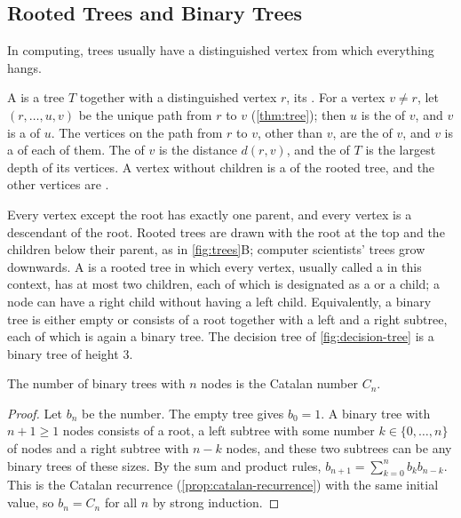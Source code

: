 \subsection{Rooted Trees and Binary Trees}

In computing, trees usually have a distinguished vertex from which everything hangs.

\begin{definition}
\label{def:rooted-tree}
A  is a tree $T$ together with a distinguished vertex $r$, its . For a vertex $v\ne r$, let $(r,\ldots,u,v)$ be the unique path from $r$ to $v$ (\cref{thm:tree}); then $u$ is the  of $v$, and $v$ is a  of $u$. The vertices on the path from $r$ to $v$, other than $v$, are the  of $v$, and $v$ is a  of each of them. The  of $v$ is the distance $d(r,v)$, and the  of $T$ is the largest depth of its vertices. A vertex without children is a  of the rooted tree, and the other vertices are .
\end{definition}

Every vertex except the root has exactly one parent, and every vertex is a descendant of the root. Rooted trees are drawn with the root at the top and the children below their parent, as in \cref{fig:trees}B; computer scientists' trees grow downwards. A  is a rooted tree in which every vertex, usually called a  in this context, has at most two children, each of which is designated as a  or a  child; a node can have a right child without having a left child. Equivalently, a binary tree is either empty or consists of a root together with a left and a right subtree, each of which is again a binary tree. The decision tree of \cref{fig:decision-tree} is a binary tree of height $3$.

\begin{proposition}
\label{prop:binary-trees-count}
The number of binary trees with $n$ nodes is the Catalan number $C_n$.
\end{proposition}

\begin{proof}
Let $b_n$ be the number. The empty tree gives $b_0=1$. A binary tree with $n+1\ge1$ nodes consists of a root, a left subtree with some number $k\in\{0,\ldots,n\}$ of nodes and a right subtree with $n-k$ nodes, and these two subtrees can be any binary trees of these sizes. By the sum and product rules, $b_{n+1}=\sum_{k=0}^{n}b_kb_{n-k}$. This is the Catalan recurrence (\cref{prop:catalan-recurrence}) with the same initial value, so $b_n=C_n$ for all $n$ by strong induction.
\end{proof}

